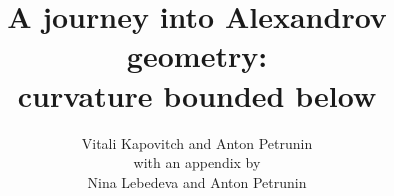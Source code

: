 \documentclass[twoside]{book}
\newcommand{\spell}[2]{#2} %
\def\thetitle{A journey into Alexandrov geometry:\\
curvature bounded below}
\def\theauthors{Vitali Kapovitch and Anton Petrunin}
\begin{document}
\spell{\pagestyle{empty}\renewcommand\includegraphics[2][{}]{}\def\emph{\textit}\renewcommand\footnote[1]{\ (#1)}\renewcommand\z{}\renewcommand\section[1]{SECTION. {#1} SECTION.}}{}

\frontmatter
\title{\thetitle}
\author{\theauthors\\
with an appendix by\\
Nina Lebedeva and Anton Petrunin}
\date{}
\maketitle
\thispagestyle{empty}

\mainmatter
\newpage
\tableofcontents





%











%



\appendix




%

\backmatter



{


\def\emph{\textit}

\printbibliography[heading=bibintoc]
\fussy
}
\end{document}
